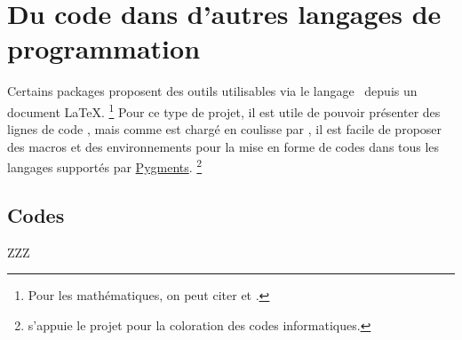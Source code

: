 \documentclass{../main/main}
\begin{document}
\section{Du code dans d'autres langages de programmation}

Certains packages proposent des outils utilisables via le langage \lua\ depuis un document \LaTeX.%
\footnote{
	Pour les mathématiques, on peut citer  et .
}
Pour ce type de projet, il est utile de pouvoir présenter des lignes de code \lua, mais comme  est chargé en coulisse par \thisproj, il est facile de proposer des macros et des environnements pour la mise en forme de codes dans tous les langages supportés par \href{https://pygments.org/}{Pygments}.%
\footnote{
	 s'appuie le projet   pour la coloration des codes informatiques.
}



\subsection{Codes }

ZZZ
\end{document}
